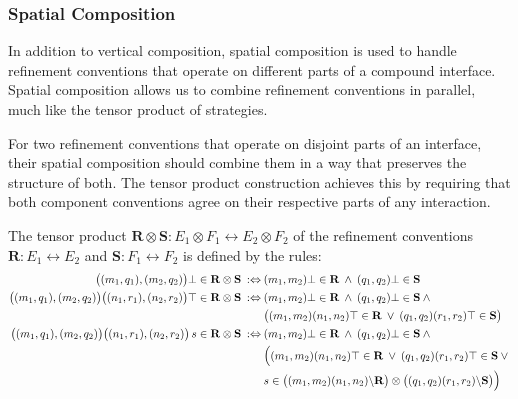 \subsubsection{Spatial Composition}

In addition to vertical composition,
spatial composition is used to handle
refinement conventions that operate on
different parts of a compound interface.
Spatial composition allows us to combine
refinement conventions in parallel,
much like the tensor product of strategies.

For two refinement conventions
that operate on disjoint parts of an interface,
their spatial composition should combine them
in a way that preserves the structure of both.
The tensor product construction achieves this
by requiring that both component conventions
agree on their respective parts of any interaction.

\begin{definition}
  The tensor product
  $\mathbf{R} \otimes \mathbf{S} :
  E_1 \otimes F_1 \leftrightarrow E_2 \otimes F_2$
  of the refinement conventions
  $\mathbf{R} : E_1 \leftrightarrow E_2$ and
  $\mathbf{S} : F_1 \leftrightarrow F_2$
  is defined by the rules:
  \begin{align*}
    \bigl( (m_1,q_1), (m_2,q_2) \bigr)\bot \in \mathbf{R} \otimes \mathbf{S}
    \::\Leftrightarrow\: &
    (m_1, m_2)\bot \in \mathbf{R}
    \:\wedge\:
    (q_1, q_2)\bot \in \mathbf{S}
    \\
    \bigl( (m_1,q_1), (m_2,q_2) \bigr)
    \bigl( (n_1,r_1), (n_2,r_2) \bigr)\top
    \in \mathbf{R} \otimes \mathbf{S}
    \::\Leftrightarrow\: &
    (m_1, m_2)\bot \in \mathbf{R}
    \:\wedge\:
    (q_1, q_2)\bot \in \mathbf{S}
    \:\wedge\: \\
    & \bigl( (m_1,m_2)(n_1,n_2)\top \in \mathbf{R} \:\vee\:
    (q_1,q_2)(r_1,r_2)\top \in \mathbf{S} \bigr)
    \\
    \bigl( (m_1,q_1), (m_2,q_2) \bigr)
    \bigl( (n_1,r_1), (n_2,r_2) \bigr) \,s
    \in \mathbf{R} \otimes \mathbf{S}
    \::\Leftrightarrow\: &
    (m_1, m_2)\bot \in \mathbf{R}
    \:\wedge\:
    (q_1, q_2)\bot \in \mathbf{S} \: \wedge\: \\
    & \large\bigl( (m_1,m_2)(n_1,n_2)\top \in \mathbf{R} \: \vee \:
      (q_1,q_2)(r_1,r_2)\top \in \mathbf{S} \: \vee \:\\
      & s \in \bigl( (m_1,m_2)(n_1,n_2) \backslash \mathbf{R} \bigr) \otimes
    \bigl( (q_1,q_2)(r_1,r_2) \backslash \mathbf{S} \bigr)\large\bigr)
  \end{align*}
\end{definition}

